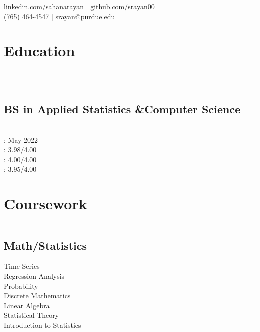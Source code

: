 \documentclass[]{sahana}
\begin{document}
{\href{https://www.linkedin.com/in/sahanarayan}{linkedin.com/sahanarayan} |
 \href{https://github.com/srayan00}{github.com/srayan00}\\
(765) 464-4547 | srayan@purdue.edu \\
}
%
%
\begin{minipage}[t]{0.33\textwidth}
\section{Education} 
\noindent\rule{5cm}{0.4pt}\\
\vspace{-8pt}
\subsection{BS in Applied Statistics \&\newline Computer Science}
\\
 : May 2022\\
 : 3.98/4.00\\
 : 4.00/4.00\\
 : 3.95/4.00
\vspace{-5pt}
\sectionsep

\section{Coursework}
\noindent\rule{5cm}{0.4pt}
\subsection{Math/Statistics}
Time Series\\
Regression Analysis\\
Probability\\
Discrete Mathematics\\
Linear Algebra\\
Statistical Theory\\
Introduction to Statistics
\vspace{6pt}

\end{minipage}
\end{document}
